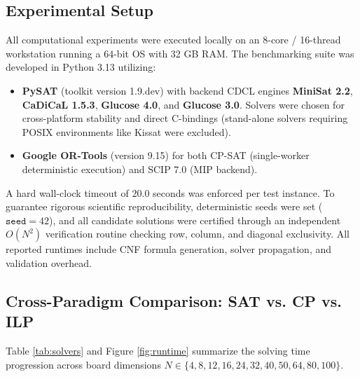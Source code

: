 \documentclass[a4paper,fleqn]{cas-sc}
\begin{document}
\subsection{Experimental Setup}
All computational experiments were executed locally on an 8-core / 16-thread workstation running a 64-bit OS with 32 GB RAM. The benchmarking suite was developed in Python 3.13 utilizing:
\begin{itemize}
    \item \textbf{PySAT} (toolkit version 1.9.dev) with backend CDCL engines \textbf{MiniSat 2.2}, \textbf{CaDiCaL 1.5.3}, \textbf{Glucose 4.0}, and \textbf{Glucose 3.0}. Solvers were chosen for cross-platform stability and direct C-bindings (stand-alone solvers requiring POSIX environments like Kissat were excluded).
    \item \textbf{Google OR-Tools} (version 9.15) for both CP-SAT (single-worker deterministic execution) and SCIP 7.0 (MIP backend).
\end{itemize}
A hard wall-clock timeout of $20.0$ seconds was enforced per test instance. To guarantee rigorous scientific reproducibility, deterministic seeds were set ($\mathtt{seed}=42$), and all candidate solutions were certified through an independent $O(N^2)$ verification routine checking row, column, and diagonal exclusivity. All reported runtimes include CNF formula generation, solver propagation, and validation overhead.

\subsection{Cross-Paradigm Comparison: SAT vs. CP vs. ILP}
Table \ref{tab:solvers} and Figure \ref{fig:runtime} summarize the solving time progression across board dimensions $N \in \{4, 8, 12, 16, 24, 32, 40, 50, 64, 80, 100\}$.
\end{document}
